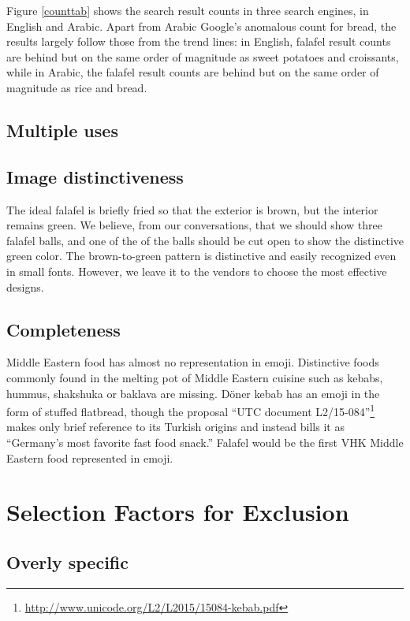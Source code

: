 \documentclass[a4paper,10pt]{article}
\begin{document}
Figure \ref{counttab} shows the search result counts in three search engines, in English
and Arabic. Apart from Arabic Google's anomalous count for bread, the results largely
follow those from the trend lines: in English, falafel result counts are behind but
on the same order of magnitude as sweet potatoes and croissants, while in Arabic, the
falafel result counts are behind but on the same order of magnitude as rice and bread.


\subsection{Multiple uses}



\subsection{Image distinctiveness}
The ideal falafel is briefly fried so that the exterior is brown, but the interior remains green. We believe, from
our conversations, that we should show three falafel balls, and one of the of the balls should be cut open to show
the distinctive green color. The brown-to-green pattern is distinctive and easily recognized even in small fonts.
However, we leave it to the vendors to choose the most effective designs.

\subsection{Completeness}
Middle Eastern food has almost no representation in emoji. Distinctive foods
commonly found in the melting pot of Middle Eastern cuisine such as kebabs, hummus, shakshuka or
baklava are missing.  Döner kebab has an emoji in the form
of {\sc stuffed flatbread}, though the proposal ``UTC document
L2/15-084''\footnote{\url{http://www.unicode.org/L2/L2015/15084-kebab.pdf}} makes
only brief reference to its Turkish origins and instead bills it as ``Germany's most
favorite fast food snack.''  {\sc Falafel} would be the first VHK Middle Eastern food
represented in emoji.

\section{Selection Factors for Exclusion}

\subsection{Overly specific}
\end{document}
